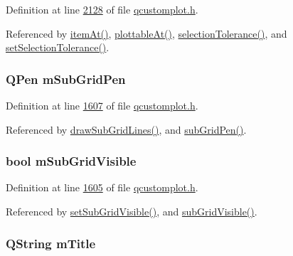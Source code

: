 Definition at line \hyperlink{a00116_source_l02128}{2128} of file \hyperlink{a00116_source}{qcustomplot.\+h}.



Referenced by \hyperlink{a00115_source_l06924}{item\+At()}, \hyperlink{a00115_source_l06606}{plottable\+At()}, \hyperlink{a00116_source_l01976}{selection\+Tolerance()}, and \hyperlink{a00115_source_l06352}{set\+Selection\+Tolerance()}.

\hypertarget{a00116_af21f3a7972c59242965129b985f53556}{
\subsubsection[{m\+Sub\+Grid\+Pen}]{\setlength{\rightskip}{0pt plus 5cm}Q\+Pen m\+Sub\+Grid\+Pen}}\label{a00116_af21f3a7972c59242965129b985f53556}


Definition at line \hyperlink{a00116_source_l01607}{1607} of file \hyperlink{a00116_source}{qcustomplot.\+h}.



Referenced by \hyperlink{a00115_source_l14331}{draw\+Sub\+Grid\+Lines()}, and \hyperlink{a00116_source_l01592}{sub\+Grid\+Pen()}.

\hypertarget{a00116_a117dd29d26688e4651a5aae265e1f1b9}{
\subsubsection[{m\+Sub\+Grid\+Visible}]{\setlength{\rightskip}{0pt plus 5cm}bool m\+Sub\+Grid\+Visible}}\label{a00116_a117dd29d26688e4651a5aae265e1f1b9}


Definition at line \hyperlink{a00116_source_l01605}{1605} of file \hyperlink{a00116_source}{qcustomplot.\+h}.



Referenced by \hyperlink{a00115_source_l14173}{set\+Sub\+Grid\+Visible()}, and \hyperlink{a00116_source_l01588}{sub\+Grid\+Visible()}.

\hypertarget{a00116_a897f8f3962601be2f02346e99e1fd7fb}{
\subsubsection[{m\+Title}]{\setlength{\rightskip}{0pt plus 5cm}Q\+String m\+Title}}\label{a00116_a897f8f3962601be2f02346e99e1fd7fb}


